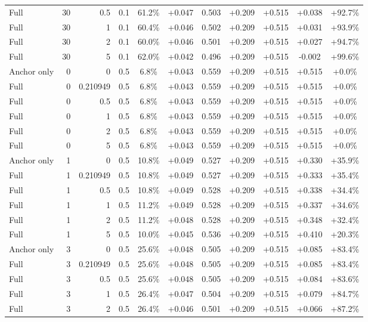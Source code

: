 \begin{table}[htbp]
\begin{tabular}{lrrrccccccc}
Full & 30 & 0.5 & 0.1 & 61.2\% & +0.047 & 0.503 & +0.209 & +0.515 & +0.038 & +92.7\% \\
Full & 30 & 1 & 0.1 & 60.4\% & +0.046 & 0.502 & +0.209 & +0.515 & +0.031 & +93.9\% \\
Full & 30 & 2 & 0.1 & 60.0\% & +0.046 & 0.501 & +0.209 & +0.515 & +0.027 & +94.7\% \\
Full & 30 & 5 & 0.1 & 62.0\% & +0.042 & 0.496 & +0.209 & +0.515 & -0.002 & +99.6\% \\
Anchor only & 0 & 0 & 0.5 & 6.8\% & +0.043 & 0.559 & +0.209 & +0.515 & +0.515 & +0.0\% \\
Full & 0 & 0.210949 & 0.5 & 6.8\% & +0.043 & 0.559 & +0.209 & +0.515 & +0.515 & +0.0\% \\
Full & 0 & 0.5 & 0.5 & 6.8\% & +0.043 & 0.559 & +0.209 & +0.515 & +0.515 & +0.0\% \\
Full & 0 & 1 & 0.5 & 6.8\% & +0.043 & 0.559 & +0.209 & +0.515 & +0.515 & +0.0\% \\
Full & 0 & 2 & 0.5 & 6.8\% & +0.043 & 0.559 & +0.209 & +0.515 & +0.515 & +0.0\% \\
Full & 0 & 5 & 0.5 & 6.8\% & +0.043 & 0.559 & +0.209 & +0.515 & +0.515 & +0.0\% \\
Anchor only & 1 & 0 & 0.5 & 10.8\% & +0.049 & 0.527 & +0.209 & +0.515 & +0.330 & +35.9\% \\
Full & 1 & 0.210949 & 0.5 & 10.8\% & +0.049 & 0.527 & +0.209 & +0.515 & +0.333 & +35.4\% \\
Full & 1 & 0.5 & 0.5 & 10.8\% & +0.049 & 0.528 & +0.209 & +0.515 & +0.338 & +34.4\% \\
Full & 1 & 1 & 0.5 & 11.2\% & +0.049 & 0.528 & +0.209 & +0.515 & +0.337 & +34.6\% \\
Full & 1 & 2 & 0.5 & 11.2\% & +0.048 & 0.528 & +0.209 & +0.515 & +0.348 & +32.4\% \\
Full & 1 & 5 & 0.5 & 10.0\% & +0.045 & 0.536 & +0.209 & +0.515 & +0.410 & +20.3\% \\
Anchor only & 3 & 0 & 0.5 & 25.6\% & +0.048 & 0.505 & +0.209 & +0.515 & +0.085 & +83.4\% \\
Full & 3 & 0.210949 & 0.5 & 25.6\% & +0.048 & 0.505 & +0.209 & +0.515 & +0.085 & +83.4\% \\
Full & 3 & 0.5 & 0.5 & 25.6\% & +0.048 & 0.505 & +0.209 & +0.515 & +0.084 & +83.6\% \\
Full & 3 & 1 & 0.5 & 26.4\% & +0.047 & 0.504 & +0.209 & +0.515 & +0.079 & +84.7\% \\
Full & 3 & 2 & 0.5 & 26.4\% & +0.046 & 0.501 & +0.209 & +0.515 & +0.066 & +87.2\% \\

\end{tabular}
\end{table}
